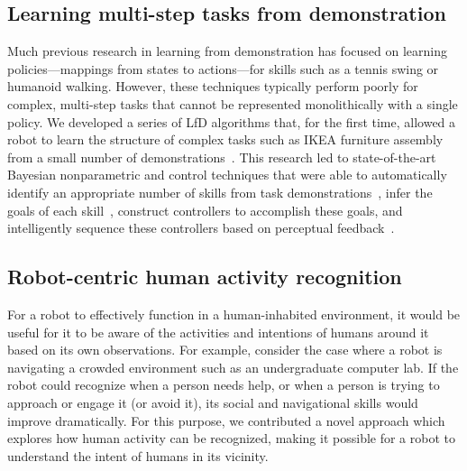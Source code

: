 \subsection{Learning multi-step tasks from demonstration}
Much previous research in learning from demonstration has focused on
learning policies---mappings from states to actions---for skills such
as a tennis swing or humanoid walking.  However, these techniques
typically perform poorly for complex, multi-step tasks that cannot be
represented monolithically with a single policy.  We developed a
series of LfD algorithms that, for the first time, allowed a robot to
learn the structure of complex tasks such as IKEA furniture assembly
from a small number of
demonstrations~\cite{niekum2013semantically,niekum2013incremental,niekum2015online,niekum2012learning,niekum2015learning}. This
research led to state-of-the-art Bayesian nonparametric and control
techniques that were able to automatically identify an appropriate
number of skills from task demonstrations~\cite{niekum2012learning},
infer the goals of each
skill~\cite{niekum2011clustering,niekum2015online}, construct
controllers to accomplish these goals, and intelligently sequence
these controllers based on perceptual
feedback~\cite{niekum2013semantically,niekum2013incremental,niekum2015learning}.

\subsection{Robot-centric human activity recognition}
For a robot to effectively function in a human-inhabited environment,
it would be useful for it to be aware of the activities and
intentions of humans around it based on its own observations. For
example, consider the case where a robot is navigating a crowded
environment such as an undergraduate computer lab. If the robot could
recognize when a person needs help, or when a person is trying to
approach or engage it (or avoid it), its social and navigational
skills would improve dramatically.  For this purpose, we contributed a novel 
approach which explores how human activity can be
recognized, making it possible for a robot to understand the intent
of humans in its vicinity.


